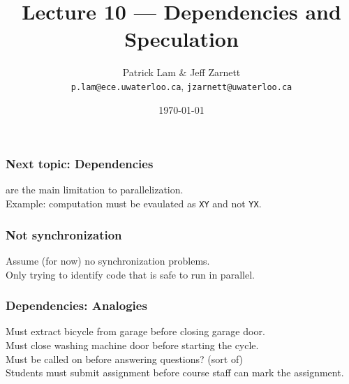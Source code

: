 
\usepackage{multi row}

\title{Lecture 10 --- Dependencies and Speculation }

\author{Patrick Lam \& Jeff Zarnett \\ \small \texttt{p.lam@ece.uwaterloo.ca}, \texttt{jzarnett@uwaterloo.ca}}
\date{\today}




\begin{frame}
  \titlepage

 \end{frame}

\begin{frame}
  \frametitle{Next topic: Dependencies}

  
      are the main
      limitation to parallelization.\\[1em]
     Example: computation must be evaulated as {\tt XY} and not {\tt YX}.\\[1em]
  
\end{frame}

\begin{frame}
  \frametitle{Not synchronization}

  
      Assume (for now) no synchronization problems.\\[1em]
      Only trying to identify code that is safe to run in
      parallel.

  
\end{frame}

\begin{frame}
\frametitle{Dependencies: Analogies}

Must extract bicycle from garage before closing garage door.\\[1em]

Must close washing machine door before starting the cycle.\\[1em]

Must be called on before answering questions? (sort of)\\[1em]

Students must submit assignment before course staff can mark the assignment.

\end{frame}

